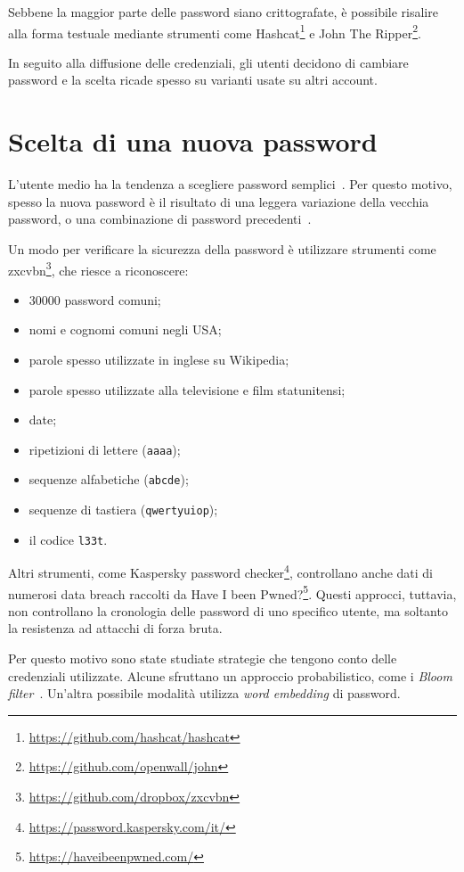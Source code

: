 Sebbene la maggior parte delle password siano crittografate, è possibile risalire alla forma testuale mediante strumenti come Hashcat\footnote{\url{https://github.com/hashcat/hashcat}} e John The Ripper\footnote{\url{https://github.com/openwall/john}}.

In seguito alla diffusione delle credenziali, gli utenti decidono di cambiare password e la scelta ricade spesso su varianti usate su altri account.
\section{Scelta di una nuova password}
\label{sec:scelta di una nuova password}
L'utente medio ha la tendenza a scegliere password semplici~\cite{obspasshab}. Per questo motivo, spesso la nuova password è il risultato di una leggera variazione della vecchia password, o una combinazione di password precedenti~\cite{hypr}.

Un modo per verificare la sicurezza della password è utilizzare strumenti come zxcvbn\footnote{\url{https://github.com/dropbox/zxcvbn}}, che riesce a riconoscere:
\begin{itemize}
    \item 30000 password comuni;
    \item nomi e cognomi comuni negli USA;
    \item parole spesso utilizzate in inglese su Wikipedia;
    \item parole spesso utilizzate alla televisione e film statunitensi;
    \item date;
    \item ripetizioni di lettere (\texttt{aaaa});
    \item sequenze alfabetiche (\texttt{abcde});
    \item sequenze di tastiera (\texttt{qwertyuiop});
    \item il codice \texttt{l33t}.
\end{itemize}

Altri strumenti, come Kaspersky password checker\footnote{\url{https://password.kaspersky.com/it/}}, controllano anche dati di numerosi data breach raccolti da Have I been Pwned?\footnote{\url{https://haveibeenpwned.com/}}.
Questi approcci, tuttavia, non controllano la cronologia delle password di uno specifico utente, ma soltanto la resistenza ad attacchi di forza bruta.

Per questo motivo sono state studiate strategie che tengono conto delle credenziali utilizzate.
Alcune sfruttano un approccio probabilistico, come i \emph{Bloom filter}~\cite{bloom}. Un'altra possibile modalità utilizza \emph{word embedding} di password.

